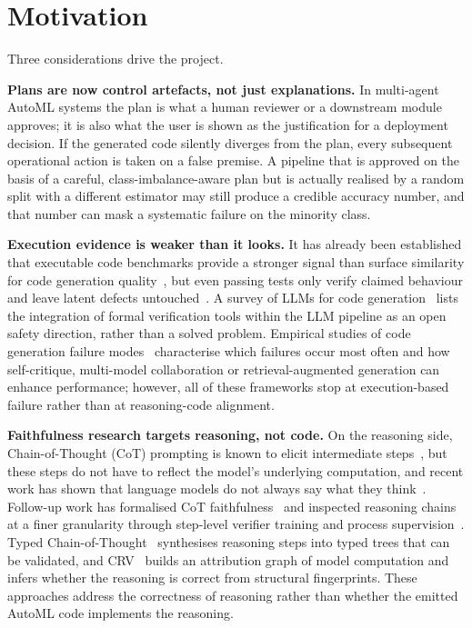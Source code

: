\needspace{0.28\textheight}
\section{Motivation}

Three considerations drive the project.

\textbf{Plans are now control artefacts, not just explanations.}
In multi-agent AutoML systems the plan is what a human reviewer or
a downstream module approves; it is also what the user is shown as
the justification for a deployment decision. If the generated code
silently diverges from the plan, every subsequent operational action
is taken on a false premise. A pipeline that is approved on the
basis of a careful, class-imbalance-aware plan but is actually
realised by a random split with a different estimator may still
produce a credible accuracy number, and that number can mask a
systematic failure on the minority class.

\textbf{Execution evidence is weaker than it looks.}
It has already been established that executable code benchmarks
provide a stronger signal than surface similarity for code generation
quality~\cite{humaneval,programsynthesis}, but even passing tests
only verify claimed behaviour and leave latent defects
untouched~\cite{copilot}. A survey of LLMs for code
generation~\cite{jiang2026survey} lists the integration of formal
verification tools within the LLM pipeline as an open safety
direction, rather than a solved problem. Empirical studies of code
generation failure modes~\cite{shen2026failure} characterise which
failures occur most often and how self-critique, multi-model
collaboration or retrieval-augmented generation can enhance
performance; however, all of these frameworks stop at
execution-based failure rather than at reasoning-code alignment.

\textbf{Faithfulness research targets reasoning, not code.}
On the reasoning side, Chain-of-Thought (CoT) prompting is known
to elicit intermediate steps~\cite{wei2023cot}, but these steps do
not have to reflect the model's underlying computation, and recent
work has shown that language models do not always say what they
think~\cite{turpin2023}. Follow-up work has formalised CoT
faithfulness~\cite{young2026lie, jacovi2024chain} and inspected
reasoning chains at a finer granularity through step-level verifier
training and process supervision~\cite{lightman2024}. Typed
Chain-of-Thought~\cite{perrier2025} synthesises reasoning steps
into typed trees that can be validated, and
CRV~\cite{zhao2026crv} builds an attribution graph of model
computation and infers whether the reasoning is correct from
structural fingerprints. These approaches address the correctness of
reasoning rather than whether the emitted AutoML code implements the
reasoning.

